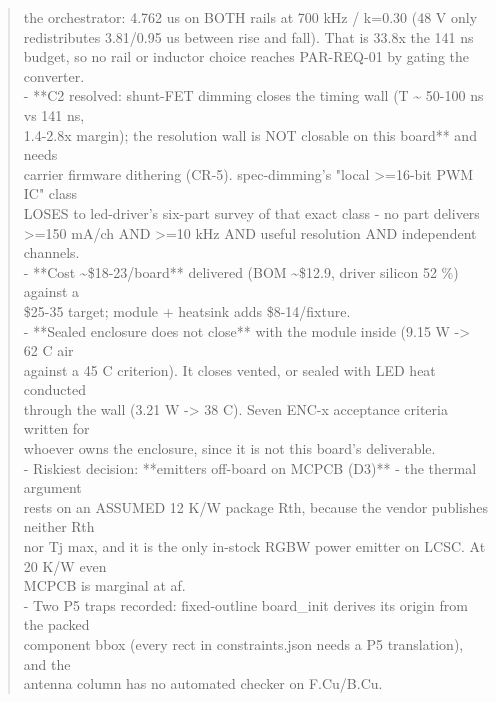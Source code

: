 \documentclass[11pt,a4paper]{article}
\begin{document}
\begin{quote}
  the orchestrator: 4.762 us on BOTH rails at 700 kHz / k=0.30 (48 V only\\
  redistributes 3.81/0.95 us between rise and fall). That is 33.8x the 141 ns\\
  budget, so no rail or inductor choice reaches PAR-REQ-01 by gating the converter.\\
- {*}{*}C2 resolved: shunt-FET dimming closes the timing wall (T \textasciitilde{} 50-100 ns vs 141 ns,\\
  1.4-2.8x margin); the resolution wall is NOT closable on this board{*}{*} and needs\\
  carrier firmware dithering (CR-5). spec-dimming's "local \textgreater{}=16-bit PWM IC" class\\
  LOSES to led-driver's six-part survey of that exact class - no part delivers\\
  \textgreater{}=150 mA/ch AND \textgreater{}=10 kHz AND useful resolution AND independent channels.\\
- {*}{*}Cost \textasciitilde{}\$18-23/board{*}{*} delivered (BOM \textasciitilde{}\$12.9, driver silicon 52 \%) against a\\
  \$25-35 target; module + heatsink adds \$8-14/fixture.\\
- {*}{*}Sealed enclosure does not close{*}{*} with the module inside (9.15 W -\textgreater{} 62 C air\\
  against a 45 C criterion). It closes vented, or sealed with LED heat conducted\\
  through the wall (3.21 W -\textgreater{} 38 C). Seven ENC-x acceptance criteria written for\\
  whoever owns the enclosure, since it is not this board's deliverable.\\
- Riskiest decision: {*}{*}emitters off-board on MCPCB (D3){*}{*} - the thermal argument\\
  rests on an ASSUMED 12 K/W package Rth, because the vendor publishes neither Rth\\
  nor Tj max, and it is the only in-stock RGBW power emitter on LCSC. At 20 K/W even\\
  MCPCB is marginal at af.\\
- Two P5 traps recorded: fixed-outline board\_init derives its origin from the packed\\
  component bbox (every rect in constraints.json needs a P5 translation), and the\\
  antenna column has no automated checker on F.Cu/B.Cu.
\end{quote}
\end{document}
